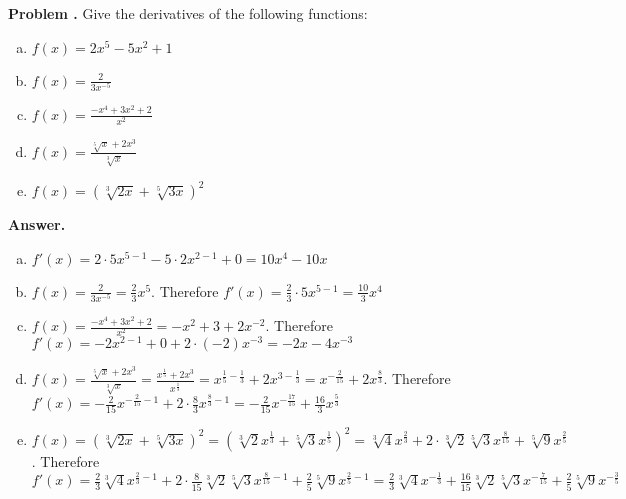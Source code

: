 \documentclass[11pt,letterpaper]{article}
\newcounter{problem}
\newcommand{\problem}{
	\stepcounter{problem}%
	\noindent \textbf{Problem \theproblem. }%
}
\newcommand{\answer}{\noindent \textbf{Answer. }}
\begin{document}
\problem Give the derivatives of the following functions:
\begin{enumerate}[(a)]
    \item $f(x) = 2x^5 - 5x^2 + 1$
    \item $f(x) = \frac{2}{3x^{-5}}$
    \item $f(x) = \frac{-x^4 + 3x^2 + 2}{x^2}$
    \item $f(x) = \frac{\sqrt[5]x + 2x^3}{\sqrt[3]{x}}$
    \item $f(x) = \left(\sqrt[3]{2x} + \sqrt[5]{3x}\right)^2$
\end{enumerate}\vspace{6mm}

\answer
\begin{enumerate}[(a)]
    \item $f'(x) =  2\cdot 5 x^{5-1} - 5 \cdot 2x^{2-1} + 0 = 10x^4-10x$
    \item $f(x) = \frac{2}{3x^{-5}} = \frac{2}{3}x^5$.  Therefore $f'(x) = \frac{2}{3}\cdot 5x^{5-1} = \frac{10}{3}x^4$
    \item $f(x) = \frac{-x^4 + 3x^2 + 2}{x^2} = -x^2+3+2x^{-2}$.  Therefore $f'(x) = -2x^{2-1}+0+2\cdot(-2)x^{-3} = -2x-4x^{-3}$
    \item $f(x) = \frac{\sqrt[5]x + 2x^3}{\sqrt[3]{x}} = \frac{x^{\frac{1}{5}}+2x^3}{x^{\frac{1}{3}}} = x^{\frac{1}{5}-\frac{1}{3}} + 2x^{3-\frac{1}{3}} = x^{-\frac{2}{15}} + 2x^{\frac{8}{3}}$.  Therefore $f'(x) = -\frac{2}{15}x^{-\frac{2}{15}-1} + 2 \cdot \frac{8}{3} x^{\frac{8}{3}-1} = -\frac{2}{15}x^{-\frac{17}{15}} + \frac{16}{3} x^{\frac{5}{3}}$
    \item $f(x) = \left(\sqrt[3]{2x} + \sqrt[5]{3x}\right)^2 = \left(\sqrt[3]{2}x^{\frac{1}{3}}+\sqrt[5]{3}x^{\frac{1}{5}}\right)^2 = \sqrt[3]{4}x^{\frac{2}{3}} + 2\cdot\sqrt[3]{2}\sqrt[5]{3}x^{\frac{8}{15}} + \sqrt[5]{9}x^{\frac{2}{5}}$.  Therefore $f'(x) = \frac{2}{3}\sqrt[3]{4}x^{\frac{2}{3}-1} + 2\cdot\frac{8}{15}\sqrt[3]{2}\sqrt[5]{3}x^{\frac{8}{15}-1} + \frac{2}{5}\sqrt[5]{9}x^{\frac{2}{5}-1} = \frac{2}{3}\sqrt[3]{4}x^{-\frac{1}{3}} + \frac{16}{15}\sqrt[3]{2}\sqrt[5]{3}x^{-\frac{7}{15}} + \frac{2}{5}\sqrt[5]{9}x^{-\frac{3}{5}}$
\end{enumerate}\vspace{6mm}

\end{document}
